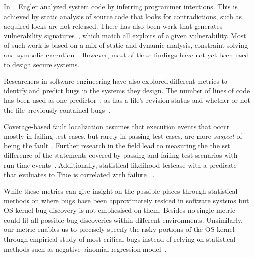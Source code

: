 In ~\cite{engler2001bugs} Engler analyzed system code by inferring programmer
intentions. This is achieved by static analysis
of source code that looks for contradictions, such as acquired locks are
not released. There has also been work that generates vulnerability
signatures~\cite{brumley2006towards}, which match all exploits
of a given vulnerability. Most of such work is based on a mix of static and
dynamic analysis, constraint solving and symbolic execution~\cite{chou2003static}.
However, most of these findings have not yet been used to design
secure systems.

Researchers in software engineering have also explored different metrics to identify and predict bugs in the systems they design. 
The number of lines of code has been used as one predictor~\cite{Bug-Location}, as has a file's revision status and
whether or not the file previously contained bugs~\cite{Bug-Location, lewis2013does}. 


Coverage-based fault localization assumes that execution events that occur mostly in failing
test cases, but rarely in passing test cases, are more \textit{suspect}
of being the fault~\cite{jones2002visualization}. Further research in the field lead to measuring the the set 
difference of the statements covered by passing and failing test scenarios with run-time events~\cite{agrawal1995fault, jones2005empirical}. 
Additionally, statistical likelihood testcase with a predicate that evaluates to True is correlated with failure ~\cite{liblit2005scalable}.



While these metrics can give insight on the possible places through statistical methods on 
where bugs have been approximately resided in software systems but OS kernel bug discovery is not emphesised on them. 
Besides no single metric could fit all possible bug discoveries within different environments. 
Unsimilarly, our metric enables us to precisely specify the risky portions of the OS kernel through empirical study of most critical bugs 
instead of relying on statistical methods such as negative binomial regression model~\cite{Bug-Location}.  

